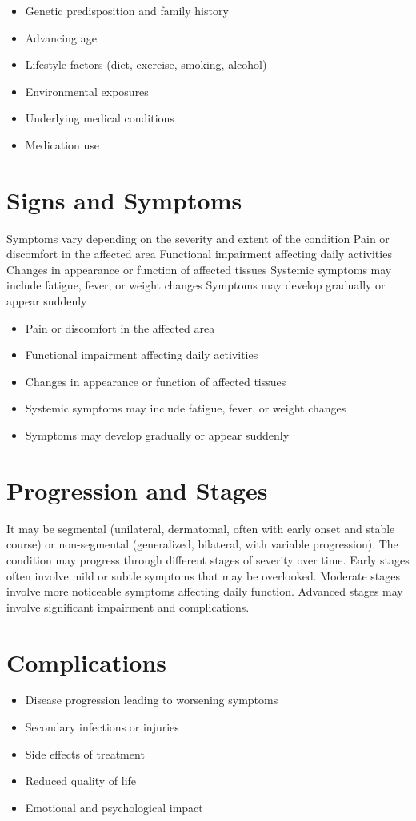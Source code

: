 \begin{itemize}[noitemsep]
  \item Genetic predisposition and family history
  \item Advancing age
  \item Lifestyle factors (diet, exercise, smoking, alcohol)
  \item Environmental exposures
  \item Underlying medical conditions
  \item Medication use
\end{itemize}
\section{Signs and Symptoms}
Symptoms vary depending on the severity and extent of the condition Pain or discomfort in the affected area Functional impairment affecting daily activities Changes in appearance or function of affected tissues Systemic symptoms may include fatigue, fever, or weight changes Symptoms may develop gradually or appear suddenly

\begin{itemize}[noitemsep]
  \item Pain or discomfort in the affected area
  \item Functional impairment affecting daily activities
  \item Changes in appearance or function of affected tissues
  \item Systemic symptoms may include fatigue, fever, or weight changes
  \item Symptoms may develop gradually or appear suddenly
\end{itemize}
\section{Progression and Stages}
It may be segmental (unilateral, dermatomal, often with early onset and stable course) or non-segmental (generalized, bilateral, with variable progression). The condition may progress through different stages of severity over time. Early stages often involve mild or subtle symptoms that may be overlooked. Moderate stages involve more noticeable symptoms affecting daily function. Advanced stages may involve significant impairment and complications.
\section{Complications}
\begin{itemize}[noitemsep]
  \item Disease progression leading to worsening symptoms
  \item Secondary infections or injuries
  \item Side effects of treatment
  \item Reduced quality of life
  \item Emotional and psychological impact
\end{itemize}
